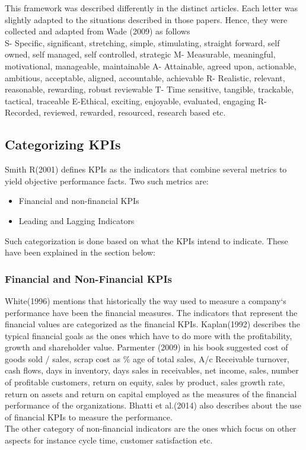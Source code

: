 This framework was described differently in the distinct articles. Each letter was slightly adapted to the situations described in those papers. Hence, they were collected and adapted from Wade (2009) as follows\\

S- Specific, significant, stretching, simple, stimulating, straight forward, self owned, self managed, self controlled, strategic
M- Measurable, meaningful, motivational, manageable, maintainable 
A- Attainable, agreed upon, actionable, ambitious, acceptable, aligned, accountable, achievable
R- Realistic, relevant, reasonable, rewarding, robust reviewable
T- Time sensitive, tangible, trackable, tactical, traceable
E-Ethical, exciting, enjoyable, evaluated, engaging
R- Recorded, reviewed, rewarded, resourced, research based etc.

\subsection{Categorizing KPIs}
Smith R(2001) defines KPIs as the indicators that combine several metrics to yield objective performance facts. Two such metrics are:\\

\begin{itemize}
    \item Financial and non-financial KPIs
    \item Leading and Lagging Indicators \\
\end{itemize}
Such categorization is done based on what the KPIs intend to indicate. These have been explained in the section below:\\

\subsubsection{Financial and Non-Financial KPIs}
White(1996) mentions that historically the way used to measure a company`s performance have been the financial measures. The indicators that represent the financial values are categorized as the financial KPIs. Kaplan(1992) describes the typical financial goals as the ones which have to do more with the profitability, growth and shareholder value. Parmenter (2009) in his book suggested cost of goods sold / sales, scrap cost as \% age of total sales, A/c Receivable turnover, cash flows, days in inventory, days sales in receivables, net income, sales, number of profitable customers, return on equity, sales by product, sales growth rate, return on assets and return on capital employed as the measures of the financial performance of the organizations. Bhatti et al.(2014) also describes about the use of financial KPIs to measure the performance. \\
The other category of non-financial indicators are the ones which focus on other aspects for instance cycle time, customer satisfaction etc.\\ 

